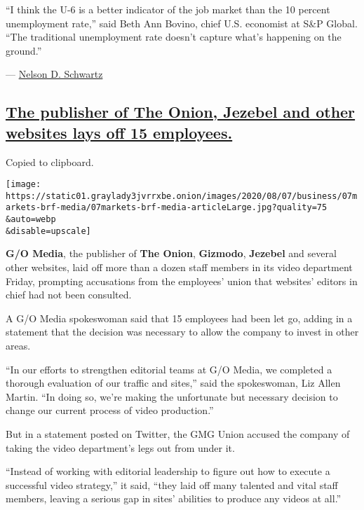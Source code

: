 ``I think the U-6 is a better indicator of the job market than the 10
percent unemployment rate,'' said Beth Ann Bovino, chief U.S. economist
at S\&P Global. ``The traditional unemployment rate doesn't capture
what's happening on the ground.''

---
\href{https://www.nytimes3xbfgragh.onion/by/nelson-d-schwartz}{Nelson D.
Schwartz}

\hypertarget{the-publisher-of-the-onion-jezebel-and-other-websites-lays-off-15-employees}{%
\subsection{\texorpdfstring{\protect\hyperlink{the-publisher-of-the-onion-jezebel-and-other-websites-lays-off-15-employees}{The
publisher of The Onion, Jezebel and other websites lays off 15
employees.}}{The publisher of The Onion, Jezebel and other websites lays off 15 employees.}}\label{the-publisher-of-the-onion-jezebel-and-other-websites-lays-off-15-employees}}

Copied to clipboard.

\texttt{[image: https://static01.graylady3jvrrxbe.onion/images/2020/08/07/business/07markets-brf-media/07markets-brf-media-articleLarge.jpg?quality=75\\\&auto=webp\\\&disable=upscale]}

\textbf{G/O Media}, the publisher of \textbf{The Onion},
\textbf{Gizmodo}, \textbf{Jezebel} and several other websites, laid off
more than a dozen staff members in its video department Friday,
prompting accusations from the employees' union that websites' editors
in chief had not been consulted.

A G/O Media spokeswoman said that 15 employees had been let go, adding
in a statement that the decision was necessary to allow the company to
invest in other areas.

``In our efforts to strengthen editorial teams at G/O Media, we
completed a thorough evaluation of our traffic and sites,'' said the
spokeswoman, Liz Allen Martin. ``In doing so, we're making the
unfortunate but necessary decision to change our current process of
video production.''

But in a statement posted on Twitter, the GMG Union accused the company
of taking the video department's legs out from under it.

``Instead of working with editorial leadership to figure out how to
execute a successful video strategy,'' it said, ``they laid off many
talented and vital staff members, leaving a serious gap in sites'
abilities to produce any videos at all.''

